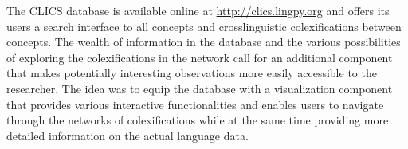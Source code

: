 The CLICS database is available online at \url{http://clics.lingpy.org} and offers its users a search interface to all concepts and crosslinguistic colexifications between concepts. The wealth of information in the database and the various possibilities of exploring the colexifications in the network call for an additional component that makes potentially interesting observations more easily accessible to the researcher. The idea was to equip the database with a visualization component that provides various interactive functionalities and enables users to navigate through the networks of colexifications while at the same time providing more detailed information on the actual language data. 
\nocite{Wold2009,Key2007}
